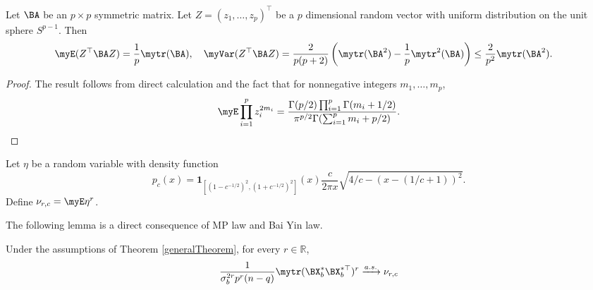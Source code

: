 \begin{lemma}\label{lemma:uniform}
    Let $\BA$ be an $p\times p$ symmetric matrix.
    Let $Z=(z_1,\ldots,z_p)^\top$ be a $p$ dimensional random vector with uniform distribution on the unit sphere $ S^{p-1}$.
    Then 
    \begin{equation*}
        \begin{split}
            &\myE (Z^\top \BA Z) = \frac{1}{p} \mytr (\BA),
        \quad
        \myVar (Z^\top \BA Z) =
        \frac{2}{p(p+2)}\left( \mytr (\BA^2) - \frac{1}{p} \mytr^2 (\BA) \right)
        \leq
        \frac{2}{p^2} \mytr (\BA^2)  
        .
        \end{split}
    \end{equation*}
\end{lemma}
\begin{proof}
    The result follows from direct calculation and the fact that for nonnegative integers $m_1,\ldots, m_{p}$,
\begin{equation*}
    \myE \prod_{i=1}^p z_i^{2 m_i} 
    =
    \frac{\Gamma(p/2) \prod_{i=1}^p \Gamma(m_i+1/2)}{ \pi^{p/2} \Gamma(\sum_{i=1}^p m_i + p/2)}
    .
\end{equation*}
\end{proof}


        
Let $\eta$ be a random variable with density function
    \begin{equation*}
        p_{c}(x)=\mathbf{1}_{\left[(1-c^{-1/2})^2,(1+c^{-1/2})^2\right]}(x)
        \frac{c}{2\pi x} \sqrt{4/c - \left(x-(1/c+1)\right)^2}.
    \end{equation*}
Define $
        \nu_{r,c}
        =
        \myE \eta^r
        $.

The following lemma is a direct consequence of MP law and Bai Yin law.
\begin{lemma}\label{lemma:MP}
    Under the assumptions of Theorem \ref{generalTheorem}, for every $r\in \mathbb R$,
    \begin{equation*}
        \frac{1}{\sigma_b^{2r} p^r (n-q)}\mytr (\BX_b^* \BX_b^{*\top})^{r} 
        \xrightarrow{a.s.}
        \nu_{r,c}
    \end{equation*}
\end{lemma}
